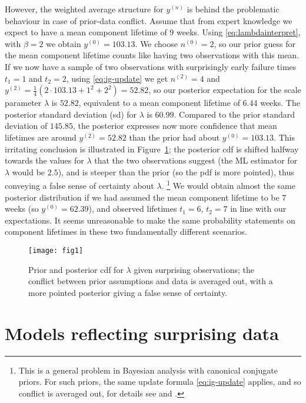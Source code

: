 \documentclass[Journal,SectionNumbers,SingleSpace,InsideFigs]{ascelike}
\newcommand{\uz}{^{(0)}} %
\newcommand{\un}{^{(n)}} %
\def\yz{y\uz}
\def\yn{y\un}
\newcommand{\yfun}[1]{y^{({#1})}}
\def\nz{n\uz}
\newcommand{\nfun}[1]{n^{({#1})}}
\begin{document}
However, the weighted average structure for $\yn$
is behind the problematic behaviour in case of prior-data conflict.
Assume that from expert knowledge we expect
to have a mean component lifetime of 9 weeks.
Using \eqref{eq:lambdainterpret}, with $\beta=2$ we obtain $\yz = 103.13$.
We choose $\nz = 2$, so our prior guess for the mean component lifetime
counts like having two observations with this mean.
If we now have a sample of two observations
with surprisingly early failure times $t_1 = 1$ and $t_2 = 2$,
using \eqref{eq:ig-update} we get $\nfun{2} = 4$
and $\yfun{2} = \frac{1}{4}(2 \cdot 103.13 + 1^2 + 2^2) = 52.82$,
so our posterior expectation for the scale parameter $\lambda$ is $52.82$,
equivalent to a mean component lifetime of $6.44$ weeks.
The posterior standard deviation (sd) for $\lambda$ is $60.99$.
Compared to the prior standard deviation of $145.85$,
the posterior expresses now more confidence that mean lifetimes are around $\yfun{2} = 52.82$
than the prior had about $\yz = 103.13$.
This irritating conclusion is illustrated in Figure~\ref{fig:weibull-pdc};
the posterior cdf is shifted halfway towards the values for $\lambda$
that the two observations suggest
(the ML estimator for $\lambda$ would be $2.5$),
and is steeper than the prior (so the pdf is more pointed),
thus conveying a false sense of certainty about $\lambda$.%
\footnote{This is a general problem in Bayesian analysis with canonical conjugate priors.
For such priors, the same update formula \eqref{eq:ig-update} applies,
and so conflict is averaged out, for details see  and .}
We would obtain almost the same %
posterior distribution
if we had assumed the mean component lifetime to be 7 weeks (so $\yz = 62.39$),
and observed lifetimes $t_1 = 6$, $t_2 = 7$ in line with our expectations.
It seems unreasonable to make the same probability statements on component lifetimes in these two fundamentally different scenarios.
%
\begin{figure}
\centering
\texttt{[image: fig1]}
\caption{Prior and posterior cdf for $\lambda$ given surprising observations;
the conflict between prior assumptions and data is averaged out,
with a more pointed posterior giving a false sense of certainty.}
\label{fig:weibull-pdc}
\end{figure}


\section{Models reflecting surprising data}
\label{sec:modforsurpr}
\end{document}
